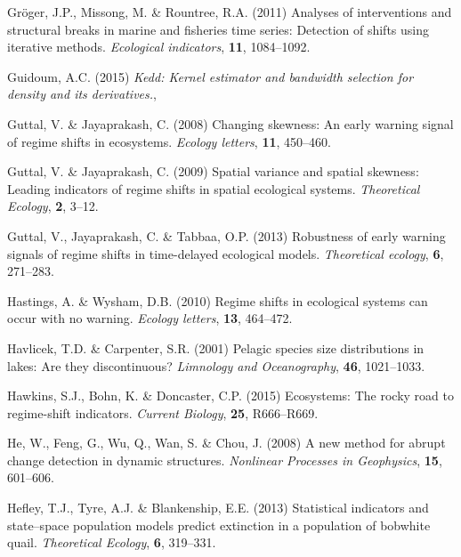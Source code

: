 \documentclass[12pt,twoside,openany]{reedthesis}
\begin{document}
\leavevmode\hypertarget{ref-groger2011analyses}{}%
Gröger, J.P., Missong, M. \& Rountree, R.A. (2011) Analyses of interventions and structural breaks in marine and fisheries time series: Detection of shifts using iterative methods. \emph{Ecological indicators}, \textbf{11}, 1084--1092.

\leavevmode\hypertarget{ref-kedd}{}%
Guidoum, A.C. (2015) \emph{Kedd: Kernel estimator and bandwidth selection for density and its derivatives.},

\leavevmode\hypertarget{ref-guttal2008changing}{}%
Guttal, V. \& Jayaprakash, C. (2008) Changing skewness: An early warning signal of regime shifts in ecosystems. \emph{Ecology letters}, \textbf{11}, 450--460.

\leavevmode\hypertarget{ref-guttal2009spatial}{}%
Guttal, V. \& Jayaprakash, C. (2009) Spatial variance and spatial skewness: Leading indicators of regime shifts in spatial ecological systems. \emph{Theoretical Ecology}, \textbf{2}, 3--12.

\leavevmode\hypertarget{ref-guttal2013robustness}{}%
Guttal, V., Jayaprakash, C. \& Tabbaa, O.P. (2013) Robustness of early warning signals of regime shifts in time-delayed ecological models. \emph{Theoretical ecology}, \textbf{6}, 271--283.

\leavevmode\hypertarget{ref-hastings2010regime}{}%
Hastings, A. \& Wysham, D.B. (2010) Regime shifts in ecological systems can occur with no warning. \emph{Ecology letters}, \textbf{13}, 464--472.

\leavevmode\hypertarget{ref-havlicek2001pelagic}{}%
Havlicek, T.D. \& Carpenter, S.R. (2001) Pelagic species size distributions in lakes: Are they discontinuous? \emph{Limnology and Oceanography}, \textbf{46}, 1021--1033.

\leavevmode\hypertarget{ref-hawkins2015ecosystems}{}%
Hawkins, S.J., Bohn, K. \& Doncaster, C.P. (2015) Ecosystems: The rocky road to regime-shift indicators. \emph{Current Biology}, \textbf{25}, R666--R669.

\leavevmode\hypertarget{ref-he2008new}{}%
He, W., Feng, G., Wu, Q., Wan, S. \& Chou, J. (2008) A new method for abrupt change detection in dynamic structures. \emph{Nonlinear Processes in Geophysics}, \textbf{15}, 601--606.

\leavevmode\hypertarget{ref-hefley2013statistical}{}%
Hefley, T.J., Tyre, A.J. \& Blankenship, E.E. (2013) Statistical indicators and state--space population models predict extinction in a population of bobwhite quail. \emph{Theoretical Ecology}, \textbf{6}, 319--331.
\end{document}
